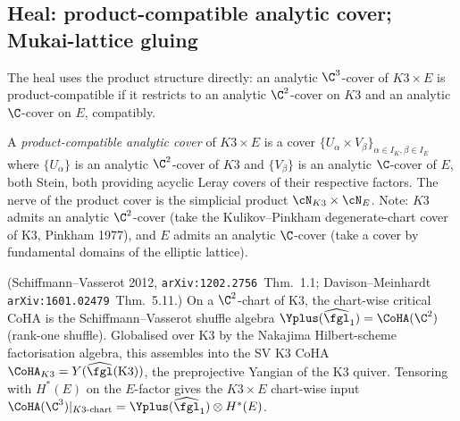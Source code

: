 \subsection*{Heal: product-compatible analytic cover; Mukai-lattice gluing}

The heal uses the product structure directly: an analytic
$\C^3$-cover of $K3 \times E$ is product-compatible if it restricts to
an analytic $\C^2$-cover on $K3$ and an analytic $\C$-cover on $E$,
compatibly.

\begin{definition}
\label{def:product-compatible-cover}
A \emph{product-compatible analytic cover} of $K3 \times E$ is a
cover $\{U_\alpha \times V_\beta\}_{\alpha \in I_K, \beta \in I_E}$
where $\{U_\alpha\}$ is an analytic $\C^2$-cover of $K3$ and
$\{V_\beta\}$ is an analytic $\C$-cover of $E$, both Stein, both
providing acyclic Leray covers of their respective factors. The
nerve of the product cover is the simplicial product
$\cN_{K3} \times \cN_E$. Note: $K3$ admits an analytic $\C^2$-cover
(take the Kulikov--Pinkham degenerate-chart cover of K3, Pinkham
1977), and $E$ admits an analytic $\C$-cover (take a cover by
fundamental domains of the elliptic lattice).
\end{definition}

\begin{proposition}
\label{prop:sv-k3-coha-chart}
\textup{(Schiffmann--Vasserot 2012, \texttt{arXiv:1202.2756}~Thm.~1.1;
Davison--Meinhardt \texttt{arXiv:1601.02479}~Thm.~5.11.)}
On a $\C^2$-chart of K3, the chart-wise critical CoHA is the
Schiffmann--Vasserot shuffle algebra
$\Yplus(\widehat{\fgl}_1) = \CoHA(\C^2)$ (rank-one shuffle).
Globalised over K3 by the Nakajima Hilbert-scheme factorisation
algebra, this assembles into the SV K3 CoHA
$\CoHA_{K3} = Y(\widehat{\fgl}(\mathrm{K3}))$, the preprojective
Yangian of the K3 quiver. Tensoring with $H^\ast(E)$ on the
$E$-factor gives the $K3 \times E$ chart-wise input
$\CoHA(\C^3)|_{K3\text{-chart}} = \Yplus(\widehat{\fgl}_1) \otimes
H^\ast(E)$.
\end{proposition}

